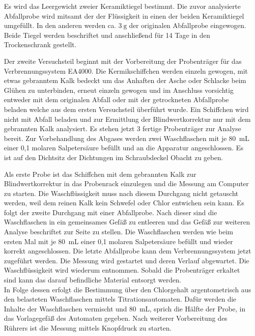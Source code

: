 Es wird das Leergewicht zweier Keramiktiegel bestimmt.
Die zuvor analysierte Abfallprobe wird mitsamt der der Flüssigkeit in einen der beiden Keramiktiegel umgefüllt.  
In den anderen werden ca. $\SI{3}{\gram}$ der originalen Abfallprobe eingewogen. Beide Tiegel werden beschriftet und anschließend für 14 Tage in den Trockenschrank gestellt.

Der zweite Versuchsteil beginnt mit der Vorbereitung der Probenträger für das Verbrennungssystem EA4000. Die Kermikschiffchen werden einzeln gewogen, mit etwas gebranntem Kalk bedeckt um das Anhaften der Asche oder Schlacke beim Glühen zu unterbinden, erneut einzeln gewogen und im Anschluss vorsichtig entweder mit dem originalen Abfall oder mit der getrockneten Abfallprobe beladen welche aus dem ersten Versuchsteil überführt wurde. Ein Schiffchen wird nicht mit Abfall beladen und zur Ermittlung der Blindwertkorrektur nur mit dem gebrannten Kalk analysiert. Es stehen jetzt 3 fertige Probenträger zur Analyse bereit.
Zur Vorbehandlung des Abgases werden zwei Waschflaschen mit je \SI{80}{\milli\liter} einer 0,1 molaren Salpetersäure befüllt und an die Apparatur angeschlossen. Es ist auf den Dichtsitz der Dichtungen im Schraubdeckel Obacht zu geben.

Als erste Probe ist das Schiffchen mit dem gebrannten Kalk zur Blindwertkorrektur in das Probenrack einzulegen und die Messung am Computer zu starten.
Die Waschflüssigkeit muss nach diesem Durchgang nicht getauscht werden, weil dem reinen Kalk kein Schwefel oder Chlor entwichen sein kann. 
Es folgt der zweite Durchgang mit einer Abfallprobe. Nach dieser sind die Waschflaschen in ein gemeinsames Gefäß zu entleeren und das Gefäß zur weiteren Analyse beschriftet zur Seite zu stellen. Die Waschflaschen werden wie beim ersten Mal mit je \SI{80}{\milli\liter} einer 0,1 molaren Salpetersäure befüllt und wieder korrekt angeschlossen.
Die letzte Abfallprobe kann dem Verbrennungssystem jetzt zugeführt werden. Die Messung wird gestartet und deren Verlauf abgewartet. Die Waschflüssigkeit wird wiederum entnommen.
Sobald die Probenträger erkaltet sind kann das darauf befindliche Material entsorgt werden.\\
In Folge dessen erfolgt die Bestimmung über den Chlorgehalt argentometrisch aus den belasteten Waschflaschen mittels Titrationsautomaten. Dafür werden die Inhalte der Waschflaschen vermischt und \SI{80}{\milli \liter}, sprich die Hälfte der Probe, in das Vorlagegefäß des Automaten gegeben. Nach weiterer Vorbereitung des Rührers ist die Messung mittels Knopfdruck zu starten.